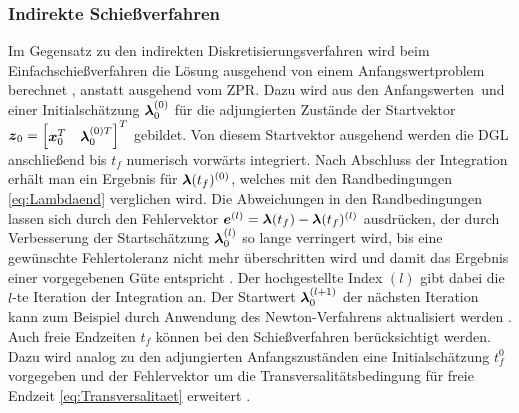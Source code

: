 \subsubsection{Indirekte Schießverfahren}\label{subsubsec:Schießverfahren_indirekt}
Im Gegensatz zu den indirekten Diskretisierungsverfahren wird beim Einfachschießverfahren die Lösung ausgehend von einem Anfangswertproblem berechnet \cite{Papageorgiou.2012}, anstatt ausgehend vom \gls{ZPR}. Dazu wird aus den Anfangswerten \xzero\,und einer Initialschätzung $\boldsymbol{\lambda}_0^{(0)}$ für die adjungierten Zustände der Startvektor $\boldsymbol{z}_0 = \begin{bmatrix}\boldsymbol{x}_0^T & \boldsymbol{\lambda}_0^{(0)T}\end{bmatrix}^T$ gebildet. Von diesem Startvektor ausgehend werden die \gls{DGL} anschließend bis $t_f$ numerisch vorwärts integriert. Nach Abschluss der Integration erhält man ein Ergebnis für $\boldsymbol{\lambda}(t_f)^{(0)}$, welches mit den Randbedingungen \eqref{eq:Lambdaend} verglichen wird. Die Abweichungen in den Randbedingungen lassen sich durch den Fehlervektor $\boldsymbol{e}^{(l)} = \boldsymbol{\lambda}(t_f) - \boldsymbol{\lambda}(t_f)^{(l)}$ ausdrücken, der durch Verbesserung der Startschätzung $\boldsymbol{\lambda}_0^{(l)}$ so lange verringert wird, bis eine gewünschte Fehlertoleranz nicht mehr überschritten wird und damit das Ergebnis einer vorgegebenen Güte entspricht \cite{Papageorgiou.2012}. Der hochgestellte Index $(l)$ gibt dabei die $l$-te Iteration der Integration an. Der Startwert $\boldsymbol{\lambda}_0^{(l+1)}$ der nächsten Iteration kann zum Beispiel durch Anwendung des Newton-Verfahrens aktualisiert werden \cite{Papageorgiou.2012}.
Auch freie Endzeiten $t_f$ können bei den Schießverfahren berücksichtigt werden. Dazu wird analog zu den adjungierten Anfangszuständen eine Initialschätzung $t_f^{0}$ vorgegeben und der Fehlervektor um die Transversalitätsbedingung für freie Endzeit \eqref{eq:Transversalitaet} erweitert \cite{Papageorgiou.2012}.
